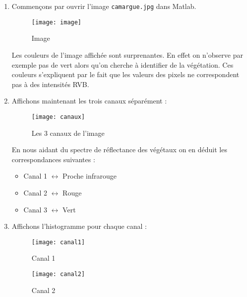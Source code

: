 \documentclass[12pt,a4paper,titlepage]{article}
\begin{document}
\begin{enumerate}
    \item{Commençons par ouvrir l'image \texttt{camargue.jpg} dans Matlab.

        \begin{figure}[H]
            \caption{Image}
            \texttt{[image: image]}
            \centering
        \end{figure}

        Les couleurs de l'image affichée sont surprenantes. En effet on n'observe par exemple
        pas de vert alors qu'on cherche à identifier de la végétation. Ces couleurs
        s'expliquent par le fait que les valeurs des pixels ne correspondent pas à des
        intensités RVB.
        }

    \item{Affichons maintenant les trois canaux séparément :

        \begin{figure}[H]
            \caption{Les 3 canaux de l'image}
            \texttt{[image: canaux]}
            \centering
        \end{figure}

        En nous aidant du spectre de réflectance des végétaux on en déduit les correspondances
        suivantes :

        \begin{itemize}
            \item{Canal 1 $\longleftrightarrow$ Proche infrarouge}
            \item{Canal 2 $\longleftrightarrow$  Rouge}
            \item{Canal 3 $\longleftrightarrow$ Vert}
        \end{itemize}
        }

    \item{
            Affichons l'histogramme pour chaque canal :

            \begin{figure}[H]
                \caption{Canal 1}
                \texttt{[image: canal1]}
                \centering
            \end{figure}

            \begin{figure}[H]
                \caption{Canal 2}
                \texttt{[image: canal2]}
                \centering
            \end{figure}

}
\end{enumerate}
\end{document}

